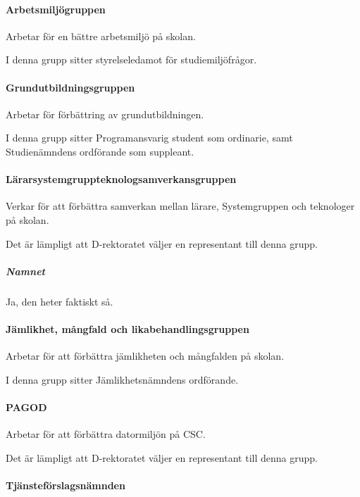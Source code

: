 \documentclass{dgovdoc}
\begin{document}
\paragraph{Arbetsmiljögruppen}

Arbetar för en bättre arbetsmiljö på skolan.

I denna grupp sitter styrelseledamot för studiemiljöfrågor.

\paragraph{Grundutbildningsgruppen}

Arbetar för förbättring av grundutbildningen.

I denna grupp sitter Programansvarig student som ordinarie, samt Studienämndens ordförande som suppleant.

\paragraph{Lärarsystemgruppteknologsamverkansgruppen}

Verkar för att förbättra samverkan mellan lärare, Systemgruppen och teknologer på skolan.

Det är lämpligt att D-rektoratet väljer en representant till denna grupp.

\subparagraph{Namnet}

Ja, den heter faktiskt så.

\paragraph{Jämlikhet, mångfald och likabehandlingsgruppen}

Arbetar för att förbättra jämlikheten och mångfalden på skolan.

I denna grupp sitter Jämlikhetsnämndens ordförande.

\paragraph{PAGOD}

Arbetar för att förbättra datormiljön på CSC.

Det är lämpligt att D-rektoratet väljer en representant till denna grupp.

\paragraph{Tjänsteförslagsnämnden}
\end{document}
